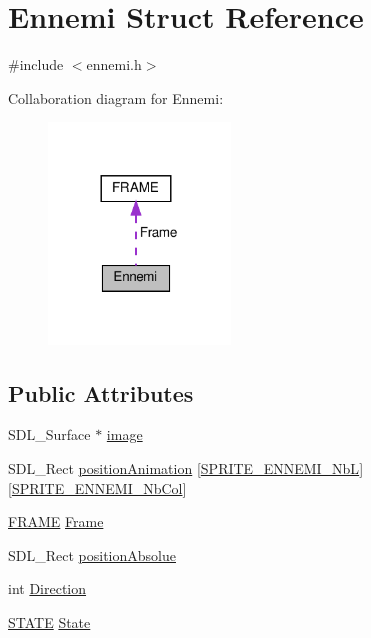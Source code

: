 \hypertarget{structEnnemi}{}\section{Ennemi Struct Reference}
\label{structEnnemi}


{\ttfamily \#include $<$ennemi.\+h$>$}



Collaboration diagram for Ennemi\+:\nopagebreak
\begin{figure}[H]
\begin{center}
\leavevmode
\includegraphics[width=137pt]{structEnnemi__coll__graph}
\end{center}
\end{figure}
\subsection*{Public Attributes}
\begin{DoxyCompactItemize}
\item 
S\+D\+L\+\_\+\+Surface $\ast$ \hyperlink{structEnnemi_aaa6f9be660b13c562cc72213abe89c92}{image}
\item 
S\+D\+L\+\_\+\+Rect \hyperlink{structEnnemi_af8e655f0f8f0c06f87c449550d464e1a}{position\+Animation} \mbox{[}\hyperlink{defs_8h_a5fcf3661be891bf3ecb5c3b0e8489a1b}{S\+P\+R\+I\+T\+E\+\_\+\+E\+N\+N\+E\+M\+I\+\_\+\+NbL}\mbox{]}\mbox{[}\hyperlink{defs_8h_aed42758993e14b4e7f601777bebea3ef}{S\+P\+R\+I\+T\+E\+\_\+\+E\+N\+N\+E\+M\+I\+\_\+\+Nb\+Col}\mbox{]}
\item 
\hyperlink{structFRAME}{F\+R\+A\+ME} \hyperlink{structEnnemi_aacc26f2351740140dcc6727b8aac5492}{Frame}
\item 
S\+D\+L\+\_\+\+Rect \hyperlink{structEnnemi_a38314184da044b6e4a8e9f96775bd94c}{position\+Absolue}
\item 
int \hyperlink{structEnnemi_a9204a1743e29170ed6ae990a07e3980a}{Direction}
\item 
\hyperlink{ennemi_8h_a275a67132f10277ada3a0ee3d616b647}{S\+T\+A\+TE} \hyperlink{structEnnemi_ae860384c5289844a9076ca5d45ebc967}{State}
\end{DoxyCompactItemize}


